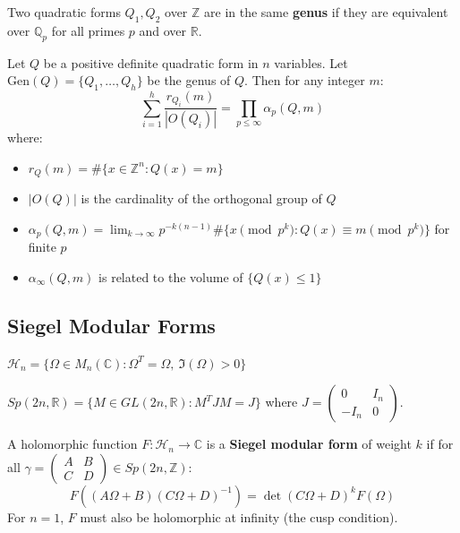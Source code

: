 \begin{definition}[Genus]
Two quadratic forms $Q_1, Q_2$ over $\mathbb{Z}$ are in the same \textbf{genus} if they are equivalent over $\mathbb{Q}_p$ for all primes $p$ and over $\mathbb{R}$.
\end{definition}

\begin{theorem}
Let $Q$ be a positive definite quadratic form in $n$ variables. Let $\text{Gen}(Q) = \{Q_1,\dots,Q_h\}$ be the genus of $Q$. Then for any integer $m$:
\[
\sum_{i=1}^h \frac{r_{Q_i}(m)}{|O(Q_i)|} = \prod_{p \leq \infty} \alpha_p(Q,m)
\]
where:
\begin{itemize}
    \item $r_Q(m) = \#\{x \in \mathbb{Z}^n : Q(x) = m\}$
    \item $|O(Q)|$ is the cardinality of the orthogonal group of $Q$
    \item $\alpha_p(Q,m) = \lim_{k \to \infty} p^{-k(n-1)} \#\{x \pmod{p^k} : Q(x) \equiv m \pmod{p^k}\}$ for finite $p$
    \item $\alpha_\infty(Q,m)$ is related to the volume of $\{Q(x) \leq 1\}$
\end{itemize}
\end{theorem}

\subsection{Siegel Modular Forms}

\begin{definition}
$\mathcal{H}_n = \{\Omega \in M_n(\mathbb{C}) : \Omega^T = \Omega,\ \Im(\Omega) > 0\}$
\end{definition}

\begin{definition}
$Sp(2n,\mathbb{R}) = \{M \in GL(2n,\mathbb{R}) : M^T J M = J\}$ where $J = \begin{pmatrix} 0 & I_n \\ -I_n & 0 \end{pmatrix}$.
\end{definition}

\begin{definition}
A holomorphic function $F: \mathcal{H}_n \to \mathbb{C}$ is a \textbf{Siegel modular form} of weight $k$ if for all $\gamma = \begin{pmatrix} A&B \\ C&D \end{pmatrix} \in Sp(2n,\mathbb{Z})$:
\[
F((A\Omega + B)(C\Omega + D)^{-1}) = \det(C\Omega + D)^k F(\Omega)
\]
For $n = 1$, $F$ must also be holomorphic at infinity (the cusp condition).
\end{definition}

